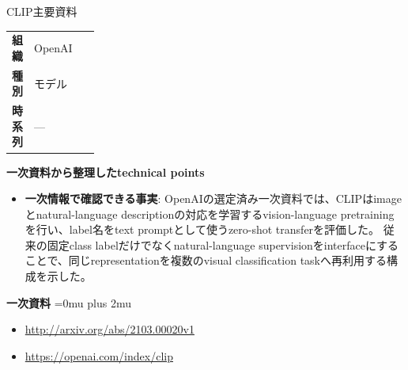 \begin{technicalnote}{CLIP}{主要資料}
\begingroup
\begin{tabularx}{\linewidth}{@{}>{\bfseries}p{0.22\linewidth}X@{}}
組織 & OpenAI \\
種別 & モデル \\
時系列 & — \\
\end{tabularx}
\smallskip
{\bfseries 一次資料から整理したtechnical points}
\begin{itemize}[leftmargin=1.5em,itemsep=0.35em]
\item \textbf{一次情報で確認できる事実}: OpenAIの選定済み一次資料では、CLIPはimageとnatural-language descriptionの対応を学習するvision-language pretrainingを行い、label名をtext promptとして使うzero-shot transferを評価した。 従来の固定class labelだけでなくnatural-language supervisionをinterfaceにすることで、同じrepresentationを複数のvisual classification taskへ再利用する構成を示した。
\end{itemize}
\begin{minipage}{\linewidth}
\begin{samepage}
{\bfseries 一次資料}
\begingroup\sloppy
\Urlmuskip=0mu plus 2mu\relax
\begin{itemize}[leftmargin=1.5em,itemsep=0.25em]
\item {\scriptsize\url{http://arxiv.org/abs/2103.00020v1}}
\item {\scriptsize\url{https://openai.com/index/clip}}
\end{itemize}
\endgroup
\end{samepage}
\end{minipage}
\endgroup
\end{technicalnote}
\medskip

